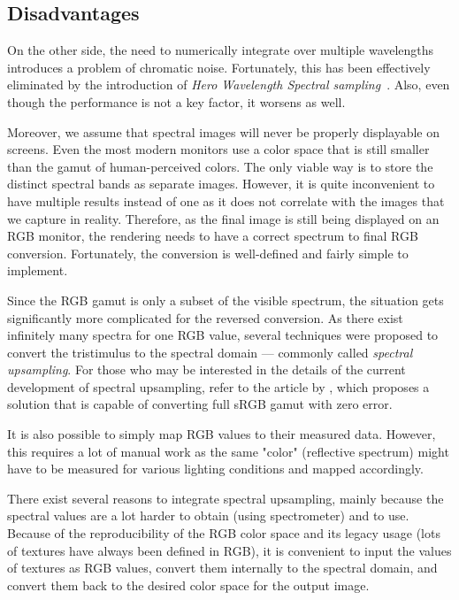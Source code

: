 \subsection{Disadvantages}

On the other side, the need to numerically integrate over multiple wavelengths introduces a problem of chromatic noise. Fortunately, this has been effectively eliminated by the introduction of \emph{Hero Wavelength Spectral sampling}~\cite{wilkie2014hero}. Also, even though the performance is not a key factor, it worsens as well. 

Moreover, we assume that spectral images will never be properly displayable on screens. Even the most modern monitors use a color space that is still smaller than the gamut of human-perceived colors. The only viable way is to store the distinct spectral bands as separate images. However, it is quite inconvenient to have multiple results instead of one as it does not correlate with the images that we capture in reality. Therefore, as the final image is still being displayed on an RGB monitor, the rendering needs to have a correct spectrum to final RGB conversion. Fortunately, the conversion is well-defined and fairly simple to implement.

Since the RGB gamut is only a subset of the visible spectrum, the situation gets significantly more complicated for the reversed conversion. As there exist infinitely many spectra for one RGB value, several techniques were proposed to convert the tristimulus to the spectral domain --- commonly called \emph{spectral upsampling}. For those who may be interested in the details of the current development of spectral upsampling, refer to the article by \citet{jakob2019low}, which proposes a solution that is capable of converting full sRGB gamut with zero error.

It is also possible to simply map RGB values to their measured data. However, this requires a lot of manual work as the same "color" (reflective spectrum) might have to be measured for various lighting conditions and mapped accordingly.

There exist several reasons to integrate spectral upsampling, mainly because the spectral values are a lot harder to obtain (using spectrometer) and to use. Because of the reproducibility of the RGB color space and its legacy usage (lots of textures have always been defined in RGB), it is convenient to input the values of textures as RGB values, convert them internally to the spectral domain, and convert them back to the desired color space for the output image.
